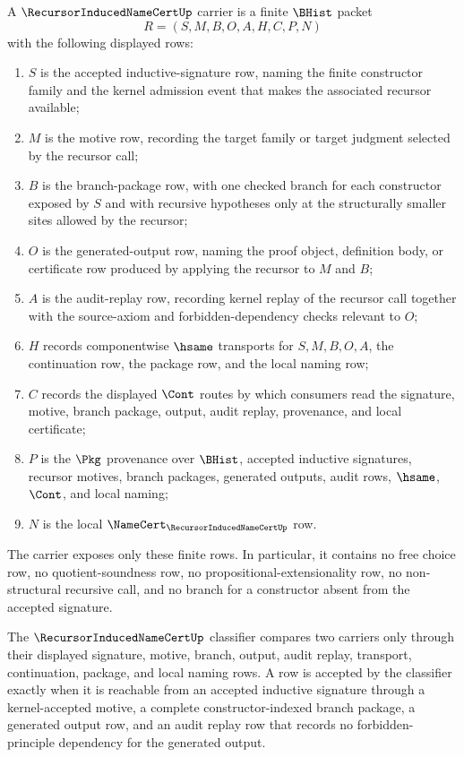 \begin{definition}
\label{def:recursor-induced-namecert-carrier}
A $\RecursorInducedNameCertUp$ carrier is a finite $\BHist$ packet
$$
R=(S,M,B,O,A,H,C,P,N)
$$
with the following displayed rows:
\begin{enumerate}
\item $S$ is the accepted inductive-signature row, naming the finite constructor family and the kernel admission event that makes the associated recursor available;
\item $M$ is the motive row, recording the target family or target judgment selected by the recursor call;
\item $B$ is the branch-package row, with one checked branch for each constructor exposed by $S$ and with recursive hypotheses only at the structurally smaller sites allowed by the recursor;
\item $O$ is the generated-output row, naming the proof object, definition body, or certificate row produced by applying the recursor to $M$ and $B$;
\item $A$ is the audit-replay row, recording kernel replay of the recursor call together with the source-axiom and forbidden-dependency checks relevant to $O$;
\item $H$ records componentwise $\hsame$ transports for $S,M,B,O,A$, the continuation row, the package row, and the local naming row;
\item $C$ records the displayed $\Cont$ routes by which consumers read the signature, motive, branch package, output, audit replay, provenance, and local certificate;
\item $P$ is the $\Pkg$ provenance over $\BHist$, accepted inductive signatures, recursor motives, branch packages, generated outputs, audit rows, $\hsame$, $\Cont$, and local naming;
\item $N$ is the local $\NameCert_{\RecursorInducedNameCertUp}$ row.
\end{enumerate}
The carrier exposes only these finite rows. In particular, it contains no free choice row, no quotient-soundness row, no propositional-extensionality row, no non-structural recursive call, and no branch for a constructor absent from the accepted signature.
\end{definition}

\begin{definition}
\label{def:recursor-generator-classifier}
The $\RecursorInducedNameCertUp$ classifier compares two carriers only through their displayed signature, motive, branch, output, audit replay, transport, continuation, package, and local naming rows. A row is accepted by the classifier exactly when it is reachable from an accepted inductive signature through a kernel-accepted motive, a complete constructor-indexed branch package, a generated output row, and an audit replay row that records no forbidden-principle dependency for the generated output.
\end{definition}

